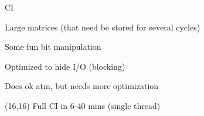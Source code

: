 \documentclass{beamer}
\begin{document}
\begin{frame}{CI}
\item Large matrices (that need be stored for several cycles)
\item Some fun bit manipulation
\item Optimized to hide I/O (blocking)
\item Does ok atm, but needs more optimization
\item (16,16) Full CI in 6-40 mins (single thread)
\end{frame}
\end{document}
